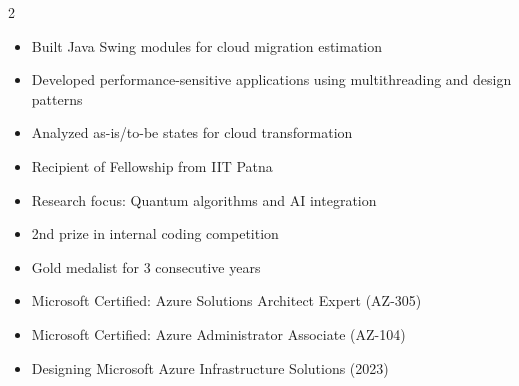 \documentclass[10pt,a4paper,ragged2e,withhyper]{altacv}
\begin{document}
\begin{paracol}{2}
\begin{itemize}
\item Built Java Swing modules for cloud migration estimation
\item Developed performance-sensitive applications using multithreading and design patterns
\item Analyzed as-is/to-be states for cloud transformation
\end{itemize}

\begin{itemize}
\item Recipient of Fellowship from IIT Patna
\item Research focus: Quantum algorithms and AI integration
\end{itemize}
\divider

\begin{itemize}
\item 2nd prize in internal coding competition
\end{itemize}
\divider

\begin{itemize}
\item Gold medalist for 3 consecutive years
\end{itemize}

\switchcolumn

\raggedright
{}

\begin{itemize}
\item Microsoft Certified: Azure Solutions Architect Expert (AZ-305)
\item Microsoft Certified: Azure Administrator Associate (AZ-104)
\item Designing Microsoft Azure Infrastructure Solutions (2023)
\end{itemize}


\end{paracol}
\end{document}
